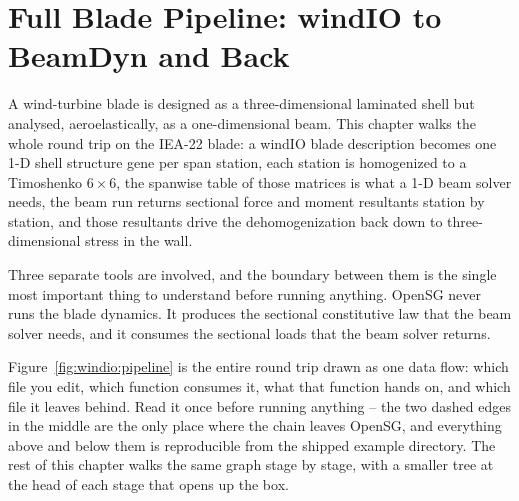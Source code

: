 \chapter{Full Blade Pipeline: windIO to BeamDyn and Back}
\label{ch:windio}

A wind-turbine blade is designed as a three-dimensional laminated shell but
analysed, aeroelastically, as a one-dimensional beam. This chapter walks the
whole round trip on the IEA-22 blade: a windIO blade description becomes one
1-D shell structure gene per span station, each station is homogenized to a
Timoshenko $6\times6$, the spanwise table of those matrices is what a 1-D beam
solver needs, the beam run returns sectional force and moment resultants
station by station, and those resultants drive the dehomogenization back down
to three-dimensional stress in the wall.

Three separate tools are involved, and the boundary between them is the single
most important thing to understand before running anything. OpenSG never runs
the blade dynamics. It produces the sectional constitutive law that the beam
solver needs, and it consumes the sectional loads that the beam solver returns.

Figure~\ref{fig:windio:pipeline} is the entire round trip drawn as one data
flow: which file you edit, which function consumes it, what that function hands
on, and which file it leaves behind. Read it once before running anything --
the two dashed edges in the middle are the only place where the chain leaves
OpenSG, and everything above and below them is reproducible from the shipped
example directory. The rest of this chapter walks the same graph stage by stage,
with a smaller tree at the head of each stage that opens up the box.

